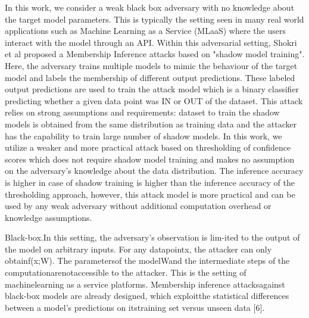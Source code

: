 In this work, we consider a weak black box adversary with no knowledge about the target model parameters.
This is typically the setting seen in many real world applications such as Machine Learning as a Service (MLaaS) where the users interact with the model through an API.
Within this adversarial setting, Shokri et al proposed a Membership Inference attacks based on "shadow model training".
Here, the adversary trains multiple models to mimic the behaviour of the target model and labels the membership of different output predictions.
These labeled output predictions are used to train the attack model which is a binary classifier predicting whether a given data point was IN or OUT of the dataset.
This attack relies on strong assumptions and requirements: dataset to train the shadow models is obtained from the same distribution as training data and the attacker has the capability to train large number of shadow models.
In this work, we utilize a weaker and more practical attack based on thresholding of confidence scores which does not require shadow model training and makes no assumption on the adversary's knowledge about the data distribution.
The inference accuracy is higher in case of shadow training is higher than the inference accuracy of the thresholding approach, however, this attack model is more practical and can be used by any weak adversary without additional computation overhead or knowledge assumptions.

Black-box.In this setting, the adversary’s observation is lim-ited to the output of the model on arbitrary inputs. For any datapointx, the attacker can only obtainf(x;W). The parametersof the modelWand the intermediate steps of the computationarenotaccessible to the attacker. This is the setting of machinelearning as a service platforms. Membership inference attacksagainst black-box models are already designed, which exploitthe statistical differences between a model’s predictions on itstraining set versus unseen data [6].

